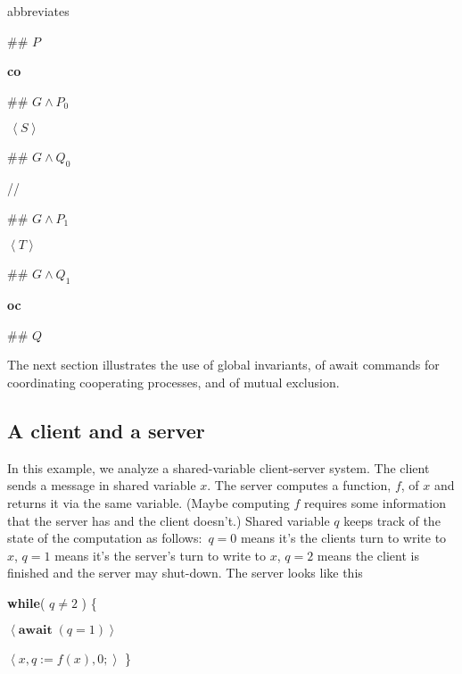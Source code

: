 \documentclass[11pt]{article}%
\begin{document}
\noindent abbreviates

\begin{code}
\#\# $P$

\textbf{co}

\begin{indent}
\item \#\# $G\wedge P_{0}$

\item $\,\left\langle S\right\rangle $

\item \#\# $G\wedge Q_{0}$
\end{indent}

//

\begin{indent}
\item \#\# $G\wedge P_{1}$

\item $\left\langle T\right\rangle $

\item \#\# $G\wedge Q_{1}$
\end{indent}

\textbf{oc}

\#\# $Q$
\end{code}

The next section illustrates the use of global invariants, of await commands
for coordinating cooperating processes, and of mutual exclusion.

\subsection{A client and a server}

In this example, we analyze a shared-variable client-server system. The client
sends a message in shared variable $x$. The server computes a function, $f$,
of $x$ and returns it via the same variable. (Maybe computing $f$ requires
some information that the server has and the client doesn't.) Shared variable
$q$ keeps track of the state of the computation as follows:\ $q=0$ means it's
the clients turn to write to $x$, $q=1$ means it's the server's turn to write
to $x$, $q=2$ means the client is finished and the server may shut-down. The
server looks like this

\begin{code}
\textbf{while}( $q\neq2$ ) \{

\begin{indent}
\item $\left\langle \mathbf{await\;}(q=1)\right\rangle $

\item $\left\langle x,q:=f(x),0;\right\rangle $ \}
\end{indent}
\end{code}
\end{document}
